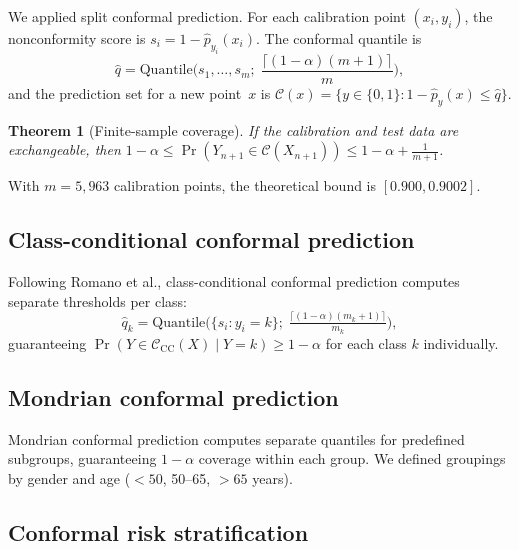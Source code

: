 \documentclass[12pt]{article}
\newtheorem{theorem}{Theorem}
\begin{document}
We applied split conformal
prediction.\cite{lei2018distribution}  For each calibration
point $(x_i, y_i)$, the nonconformity score is
$s_i = 1 - \hat{p}_{y_i}(x_i)$.  The conformal quantile is
\begin{equation}
  \hat{q} = \mathrm{Quantile}\biggl(s_1, \ldots, s_m;\;
  \frac{\lceil (1\!-\!\alpha)(m\!+\!1) \rceil}{m}\biggr),
  \label{eq:quantile}
\end{equation}
and the prediction set for a new point~$x$ is
$\mathcal{C}(x) = \{y \in \{0,1\} :
1 - \hat{p}_y(x) \leq \hat{q}\}$.

\begin{theorem}[Finite-sample coverage\cite{vovk2005algorithmic}]
If the calibration and test data are exchangeable, then
$1\!-\!\alpha \leq
\Pr(Y_{n+1}\!\in\!\mathcal{C}(X_{n+1}))
\leq 1\!-\!\alpha + \tfrac{1}{m\!+\!1}$.
\label{eq:coverage}
\end{theorem}

With $m = 5{,}963$ calibration points, the theoretical bound is
$[0.900, 0.9002]$.

\subsection{Class-conditional conformal prediction}
\label{sec:cc_conformal}

Following Romano et al.,\cite{romano2020classification}
class-conditional conformal prediction computes separate
thresholds per class:
\begin{equation}
  \hat{q}_k = \mathrm{Quantile}\biggl(\{s_i : y_i = k\};\;
  \tfrac{\lceil (1\!-\!\alpha)(m_k\!+\!1) \rceil}{m_k}\biggr),
  \label{eq:cc_quantile}
\end{equation}
guaranteeing
$\Pr(Y \in \mathcal{C}_{\mathrm{CC}}(X) \mid Y = k) \geq
1 - \alpha$ for each class $k$ individually.

\subsection{Mondrian conformal prediction}
\label{sec:mondrian}

Mondrian conformal prediction\cite{vovk2005algorithmic} computes
separate quantiles for predefined subgroups, guaranteeing
$1-\alpha$ coverage within each group.  We defined groupings by
gender and age ($<50$, 50--65, $>65$ years).

\subsection{Conformal risk stratification}
\label{sec:risk}
\end{document}
